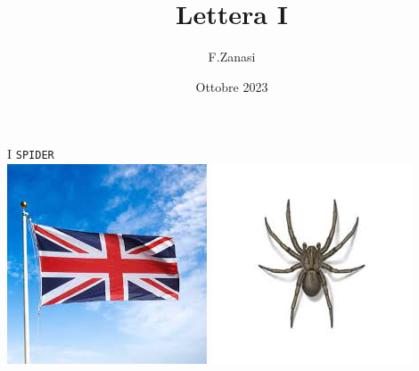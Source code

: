 \documentclass[]{article}
\title{Lettera I}
\author{F.Zanasi}
\date{Ottobre 2023}
\begin{document}
{\fontsize{150}{160}\selectfont I} 
\hspace{2.0in}
{\fontsize{80}{80}\color{black}\texttt{SP}\color{blue}\texttt{I}\color{black}\texttt{DER}} 
\\[1cm]
\includegraphics[scale=0.3]{flag-UK}
\includegraphics[scale=0.4]{spider}
\end{document}
